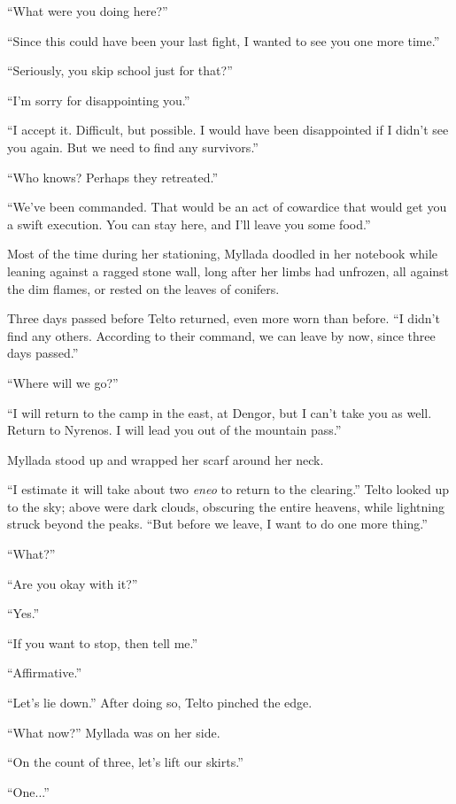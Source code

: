 ``What were you doing here?''

``Since this could have been your last fight, I wanted to see you one more time.''

``Seriously, you skip school just for that?''

``I'm sorry for disappointing you.''

``I accept it. Difficult, but possible. I would have been disappointed if I didn't see you again. But we need to find any survivors.''

``Who knows? Perhaps they retreated.''

``We've been commanded. That would be an act of cowardice that would get you a swift execution. You can stay here, and I'll leave you some food.''

\centeredstars

Most of the time during her stationing, Myllada doodled in her notebook while leaning against a ragged stone wall, long after her limbs had unfrozen, all against the dim flames, or rested on the leaves of conifers.

Three days passed before Telto returned, even more worn than before. ``I didn't find any others. According to their command, we can leave by now, since three days passed.''

``Where will we go?''

``I will return to the camp in the east, at Dengor, but I can't take you as well. Return to Nyrenos. I will lead you out of the mountain pass.''

Myllada stood up and wrapped her scarf around her neck.

``I estimate it will take about two \emph{eneo} to return to the clearing.'' Telto looked up to the sky; above were dark clouds, obscuring the entire heavens, while lightning struck beyond the peaks. ``But before we leave, I want to do one more thing.''

``What?''

``Are you okay with it?''

``Yes.''

``If you want to stop, then tell me.''

``Affirmative.''

``Let's lie down.'' After doing so, Telto pinched the edge.

``What now?'' Myllada was on her side.

``On the count of three, let's lift our skirts.''

``One...''

